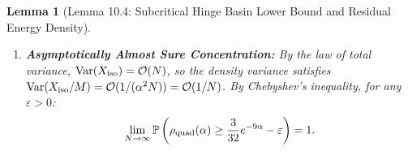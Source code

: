 \documentclass[11pt,a4paper]{article}
\newtheorem{lemma}[theorem]{Lemma}
\begin{document}
\begin{lemma}[Lemma 10.4: Subcritical Hinge Basin Lower Bound and Residual Energy Density]
\begin{enumerate}
    \begin{equation}
    \frac{\mathbb{E}[|\mathcal{C}_{\rm iso}|]}{M} = \frac{\alpha N e^{-9\alpha}(1 + \mathcal{O}(1/N))}{\alpha N} = e^{-9\alpha}(1 + \mathcal{O}(1/N)).
    \end{equation}
    Conditionally on the formula, the rounding failure of each isolated clause is an independent Bernoulli trial with parameter $p_{\rm fail} = 3/32$. Consequently, the expected asymptotic residual density satisfies:
    \begin{equation}
    \liminf_{N \to \infty} \mathbb{E}[\rho_{\rm quad}(\alpha)] \ge \frac{3}{32} e^{-9\alpha} > 0.
    \end{equation}
    \item \textbf{Asymptotically Almost Sure Concentration:} By the law of total variance, $\text{Var}(X_{\rm iso}) = \mathcal{O}(N)$, so the density variance satisfies $\text{Var}(X_{\rm iso} / M) = \mathcal{O}(1 / (\alpha^2 N)) = \mathcal{O}(1/N)$. By Chebyshev's inequality, for any $\varepsilon > 0$:
    \begin{equation}
    \lim_{N \to \infty} \mathbb{P}\left(\rho_{\rm quad}(\alpha) \ge \frac{3}{32} e^{-9\alpha} - \varepsilon\right) = 1.
    \end{equation}
\end{enumerate}
\end{lemma}
\end{document}
